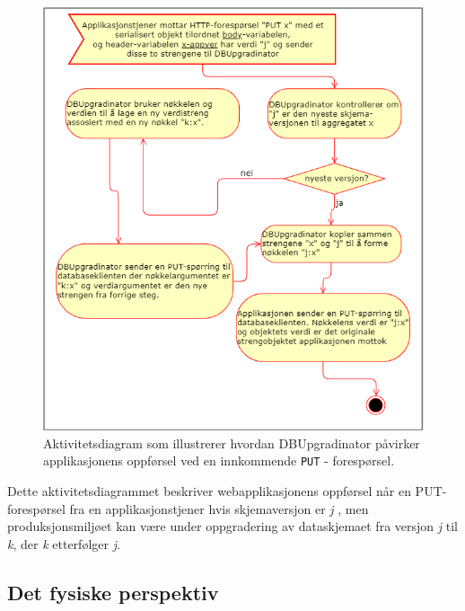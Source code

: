 \begin{figure}[!ht]
    \centering
    \includegraphics[scale=0.6]{fig/dbupgradinator-prosess-3.png}
    \caption{Aktivitetsdiagram som illustrerer hvordan DBUpgradinator påvirker applikasjonens oppførsel ved en innkommende \texttt{PUT} - forespørsel.}
    \label{fig9}
\end{figure}

Dette aktivitetsdiagrammet beskriver webapplikasjonens oppførsel når en PUT-forespørsel fra en applikasjonstjener hvis skjemaversjon er \emph{j} , men produksjonsmiljøet kan være under oppgradering av dataskjemaet fra versjon \emph{j} til \emph{k}, der \emph{k} etterfølger \emph{j}.

\newpage

\subsection{Det fysiske perspektiv}

